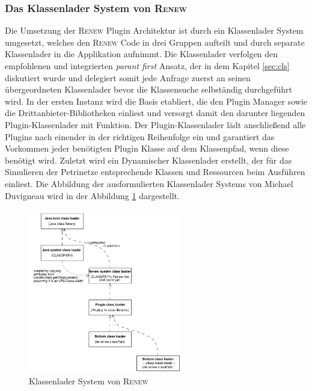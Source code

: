 		\subsubsection{Das Klassenlader System von \textsc{Renew}}
			Die Umsetzung der \textsc{Renew} Plugin Architektur ist durch ein Klassenlader System umgesetzt, welches den \textsc{Renew} Code in drei Gruppen aufteilt und durch separate Klassenlader in die Applikation aufnimmt. Die Klassenlader verfolgen den empfohlenen und integrierten \textit{parant first} Ansatz, der in dem Kapitel \ref{sec:cls} diskutiert wurde und delegiert somit jede Anfrage zuerst an seinen übergeordneten Klassenlader bevor die Klassensuche selbständig durchgeführt wird. \newline
			In der ersten Instanz wird die Basis etabliert, die den Plugin Manager sowie die Drittanbieter-Bibliotheken einliest und versorgt damit den darunter liegenden Plugin-Klassenlader mit Funktion. Der Plugin-Klassenlader lädt anschließend alle Plugins nach einender in der richtigen Reihenfolge ein und garantiert das Vorkommen jeder benötigten Plugin Klasse auf dem Klassenpfad, wenn diese benötigt wird. Zuletzt wird ein Dynamischer Klassenlader erstellt, der für das Simulieren der Petrinetze entsprechende Klassen und Ressourcen beim Ausführen einliest. \newline
			Die Abbildung der ausformulierten Klassenlader Systems von Michael Duvigneau wird in der Abbildung \ref{fig:classLoadDuv} dargestellt. \newline
			\begin{figure}[h!]
				\centering
				\includegraphics[width=0.6\textwidth]{material/images/klasslaoderDou.png}
				\caption{Klassenlader System von \textsc{Renew} \cite{Duvigneau09}}
				\label{fig:classLoadDuv}
			\end{figure}
